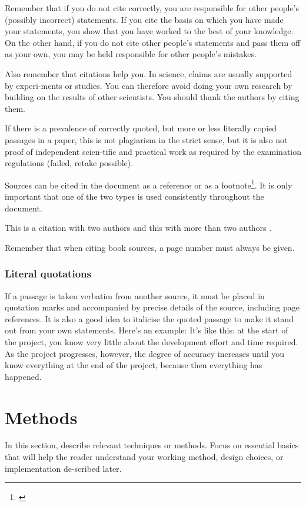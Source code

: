\documentclass[12pt]{report}           %
\theoremstyle{thesis}        %
\begin{document}
	Remember that if you do not cite correctly, you are responsible for other people's (possibly incorrect) statements. If you cite the basis on which you have made your statements, you show that you have worked to the best of your knowledge. On the other hand, if you do not cite other people's statements and pass them off as your own, you may be held responsible for other people's mistakes. 
	
	Also remember that citations help you. In science, claims are usually supported by experi-ments or studies. You can therefore avoid doing your own research by building on the results of other scientists. You should thank the authors by citing them.
	
	If there is a prevalence of correctly quoted, but more or less literally copied passages in a paper, this is not plagiarism in the strict sense, but it is also not proof of independent scien-tific and practical work as required by the examination regulations (failed, retake possible). 
	
	Sources can be cited in the document as a reference  \cite{Article} or as a footnote\footnote{\cite{Article}}. It is only important that one of the two types is used consistently throughout the document.
	
	This is a citation with two authors \cite{Chui_Approximation_1992} and this with more than two authors \cite{Leshno_Multilayer_1993}.
	
	Remember that when citing book sources, a page number must always be given.
	\subsection{Literal quotations}
	If a passage is taken verbatim from another source, it must be placed in quotation marks and accompanied by precise details of the source, including page references. It is also a good idea to italicise the quoted passage to make it stand out from your own statements. Here's an example:  \glqq It's like this: at the start of the project, you know very little about the development effort and time required. As the project progresses, however, the degree of accuracy increases until you know everything at the end of the project, because then everything has happened.\grqq\cite{kupper1986kunst}
	\chapter{Methods}
	\label{chap:theorie}
	In this section, describe relevant techniques or methods. Focus on essential basics that will help the reader understand your working method, design choices, or implementation de-scribed later.
\end{document}
